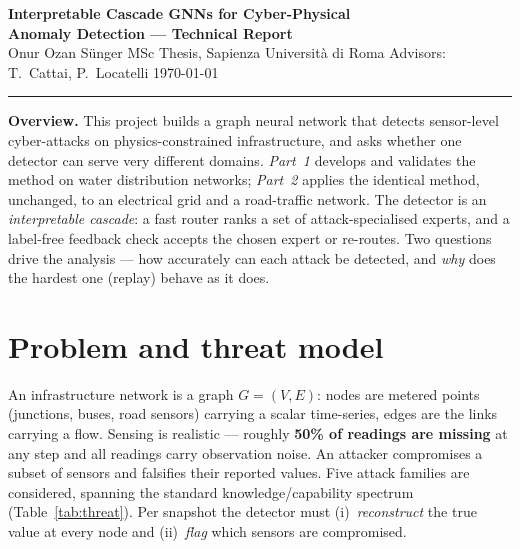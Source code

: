 \documentclass[10pt,a4paper]{article}
\begin{document}
\begin{center}
  {\Large\bfseries Interpretable Cascade GNNs for Cyber-Physical\\[1pt]
   Anomaly Detection --- Technical Report}\\[3pt]
  {\small Onur Ozan S\"unger \;\textbar\; MSc Thesis, Sapienza Universit\`a
   di Roma \;\textbar\; Advisors: T.~Cattai, P.~Locatelli \;\textbar\; \today}
\end{center}
\vspace{-2pt}\hrule\vspace{4pt}

\noindent
\textbf{Overview.} This project builds a graph neural network that detects
sensor-level cyber-attacks on physics-constrained infrastructure, and asks
whether one detector can serve very different domains. \emph{Part~1}
develops and validates the method on water distribution networks;
\emph{Part~2} applies the identical method, unchanged, to an electrical
grid and a road-traffic network. The detector is an \emph{interpretable
cascade}: a fast router ranks a set of attack-specialised experts, and a
label-free feedback check accepts the chosen expert or re-routes. Two
questions drive the analysis --- how accurately can each attack be
detected, and \emph{why} does the hardest one (replay) behave as it does.

\section{Problem and threat model}

An infrastructure network is a graph $G=(V,E)$: nodes are metered points
(junctions, buses, road sensors) carrying a scalar time-series, edges are
the links carrying a flow. Sensing is realistic --- roughly \textbf{50\% of
readings are missing} at any step and all readings carry observation noise.
An attacker compromises a subset of sensors and falsifies their reported
values. Five attack families are considered, spanning the standard
knowledge/capability spectrum (Table~\ref{tab:threat}). Per snapshot the
detector must (i)~\emph{reconstruct} the true value at every node and
(ii)~\emph{flag} which sensors are compromised.
\end{document}
